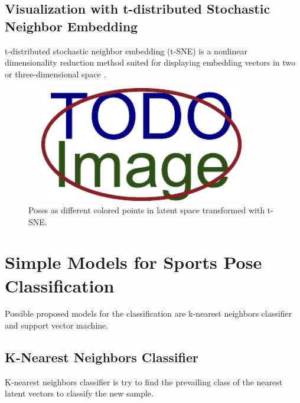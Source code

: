 \blindtext

\subsection{Visualization with t-distributed Stochastic Neighbor Embedding}

t-distributed stochastic neighbor embedding (t-SNE) is a nonlinear dimensionality reduction method suited for displaying embedding vectors in two or three-dimensional space \cite{sne-NIPS2002_6150ccc6} \cite{tsne-vandermaaten08a}. 
\blindtext

\blindtext

\blindtext

\begin{figure}[ht]\centering
  \centering
  \includegraphics[width=4in,height=2in]{figures/placeholder.pdf}
  \caption{Poses as different colored points in latent space transformed with t-SNE.}
  \label{tSNE}
\end{figure}

\blindtext

\section{Simple Models for Sports Pose Classification}

Possible proposed models for the classification are k-nearest neighbors classifier and support vector machine.
\blindtext

\blindtext

\subsection{K-Nearest Neighbors Classifier}

K-nearest neighbors classifier is try to find the prevailing class of the nearest latent vectors to classify the new sample.
\blindtext

\blindtext

\blindtext

